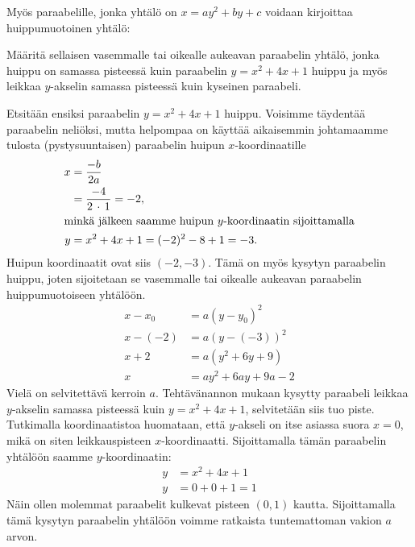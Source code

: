 Myös paraabelille, jonka yhtälö on $x=ay^2+by+c$ voidaan kirjoittaa huippumuotoinen yhtälö:


\begin{esimerkki}
    Määritä sellaisen vasemmalle tai oikealle aukeavan paraabelin yhtälö, jonka huippu on samassa pisteessä kuin paraabelin $y = x^2 + 4x +1$ huippu ja myös leikkaa $y$-akselin samassa pisteessä kuin kyseinen paraabeli.
    \begin{esimratk} %
        Etsitään ensiksi paraabelin $y = x^2 + 4x +1$ huippu. Voisimme täydentää paraabelin neliöksi, mutta helpompaa on käyttää aikaisemmin johtamaamme tulosta (pystysuuntaisen) paraabelin huipun $x$-koordinaatille
        \begin{align*}
        x &= \frac{-b}{2a} \\
          &= \frac{-4}{2\,\cdot\,1} = -2, \\
        \intertext{minkä jälkeen saamme huipun $y$-koordinaatin sijoittamalla}
        y &= x^2 + 4x +1 = (-2)^2 - 8 +1 = -3.
        \end{align*}
        Huipun koordinaatit ovat siis $(-2, -3)$. Tämä on myös kysytyn paraabelin huippu, joten sijoitetaan se vasemmalle tai oikealle aukeavan paraabelin huippumuotoiseen yhtälöön.
        \begin{align*}
        x-x_0 &= a(y-y_0)^2\\
        x-(-2) &= a(y-(-3))^2 \\
        x +2 &= a(y^2 +6y +9)\\
        x &= ay^2 +6ay +9a -2
        \end{align*}
        Vielä on selvitettävä kerroin $a$. Tehtävänannon mukaan kysytty paraabeli leikkaa $y$-akselin samassa pisteessä kuin $y = x^2 + 4x +1$, selvitetään siis tuo piste. Tutkimalla koordinaatistoa huomataan, että $y$-akseli on itse asiassa suora $x = 0$, mikä on siten leikkauspisteen $x$-koordinaatti. Sijoittamalla tämän paraabelin yhtälöön saamme $y$-koordinaatin:
        \begin{align*}
        y &= x^2 + 4x +1\\
        y &= 0 + 0 + 1 = 1
        \end{align*}
        Näin ollen molemmat paraabelit kulkevat pisteen $(0,1)$ kautta. Sijoittamalla tämä kysytyn paraabelin yhtälöön voimme ratkaista tuntemattoman vakion $a$ arvon.

\end{esimratk}
\end{esimerkki}
